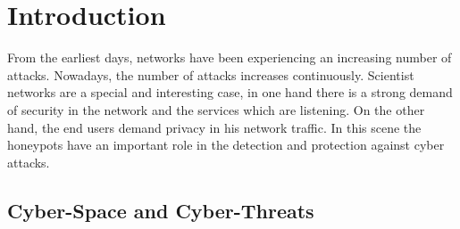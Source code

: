 \documentclass[a4paper]{llncs}
\begin{document}
\begin{abstract}
\end{abstract}


\section{Introduction}
From the earliest days, %
  networks have been experiencing an increasing number of
  attacks. Nowadays, %
the number of attacks increases continuously\cite{esset-tendencias}\cite{cni-ccn-tendencias-2014}. Scientist networks are a special and interesting case, %
in one hand there is a strong demand of security in the network and the services which are listening. On the other hand, the end users demand privacy in his network traffic. In this scene the honeypots have an important role in the detection and protection against cyber attacks.

\subsection{Cyber-Space and Cyber-Threats}
\label{sect:Scientist Networks}
\end{document}
